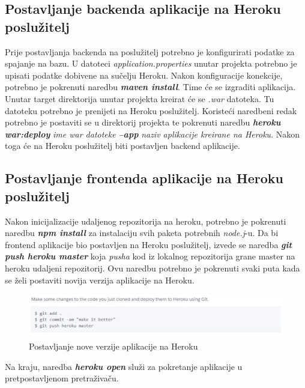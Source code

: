 				
			\subsection{Postavljanje backenda aplikacije na Heroku poslužitelj}
				Prije postavljanja backenda na poslužitelj potrebno je konfigurirati podatke za spajanje na bazu. U datoteci \textit{application.properties} unutar projekta potrebno je upisati podatke dobivene na sučelju Heroku. Nakon konfiguracije konekcije, potrebno je pokrenuti naredbu \textbf{\textit{maven install}}. Time će se izgraditi aplikacija. Unutar target direktorija unutar projekta kreirat će se \textit{.war} datoteka. Tu datoteku potrebno je prenijeti na Heroku poslužitelj.\newline
				\indent Koristeći naredbeni redak potrebno je postaviti se u direktorij projekta te pokrenuti naredbu \textbf{\textit{heroku war:deploy}} \textit{ime war datoteke} \textbf{\textit{–app}} \textit{naziv aplikacije kreirane na Heroku}. Nakon toga će na Heroku poslužitelj biti postavljen backend
				aplikacije.\\
				
				
			\subsection{Postavljanje frontenda aplikacije na Heroku poslužitelj}
				Nakon inicijalizacije udaljenog repozitorija na heroku, potrebno je pokrenuti naredbu \textbf{\textit{npm install}} za instalaciju svih paketa potrebnih \textit{node.j}-u.\newline
				\indent Da bi frontend aplikacije bio postavljen na Heroku poslužitelj, izvede se naredba
				\textbf{\textit{git push heroku master}} koja \textit{pusha} kod iz lokalnog repozitorija grane master na heroku udaljeni repozitorij. Ovu naredbu potrebno je pokrenuti svaki puta kada se želi postaviti novija verzija aplikacije na Heroku.
				\begin{figure}[htb]
					\centering
					\includegraphics[scale=0.6]{slike/herokuPush.PNG}
					\caption{Postavljanje nove verzije aplikacije na Heroku}
					\label{fig: heroku}
				\end{figure}
			
				\indent Na kraju, naredba \textit{\textbf{heroku open}} služi za pokretanje aplikacije u pretpostavljenom pretraživaču.
			
			
			\eject 